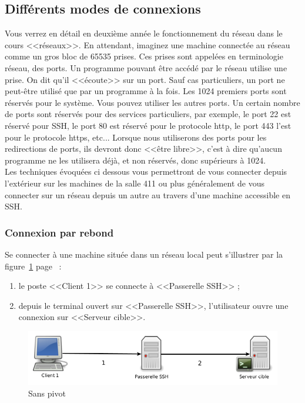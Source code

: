 \documentclass[11pt]{article}
\begin{document}
\subsection{Différents modes de connexions}

Vous verrez en détail en deuxième année le fonctionnement du réseau dans le cours <<réseaux>>.
En attendant, imaginez une machine connectée au réseau comme un gros bloc de 65535 prises. 
Ces prises sont appelées en terminologie réseau, des ports. 
Un programme pouvant être accédé par le réseau utilise une prise. 
On dit qu'il <<écoute>> sur un port. 
Sauf cas particuliers, un port ne peut-être utilisé que par un programme à la fois. 
Les 1024 premiers ports sont réservés pour le système.
Vous pouvez utiliser les autres ports.
Un certain nombre de ports sont réservés pour des services particuliers, par exemple, le port 22 est réservé pour SSH, le port 80 est réservé pour le protocole http, le port 443 l'est pour le protocole https, etc... 
Lorsque nous utiliserons des ports pour les redirections de ports, ils devront donc <<être libre>>, c'est à dire qu'aucun programme ne les utilisera déjà, et non réservés, donc supérieurs à 1024.\\

Les techniques évoquées ci dessous vous permettront de vous connecter depuis l'extérieur sur les machines de la salle 411 ou plus généralement de vous connecter sur un réseau depuis un autre au travers d'une machine accessible en SSH.

\subsubsection{Connexion par rebond}

Se connecter à une machine située dans un réseau local peut s'illustrer par la figure~\ref{pivot_simple} page~\pageref{pivot_simple} :
\begin{enumerate}
 \item le poste <<Client 1>> se connecte à <<Passerelle SSH>> ;
 \item depuis le terminal ouvert sur <<Passerelle SSH>>, l'utilisateur ouvre une connexion sur <<Serveur cible>>.
\end{enumerate}

\begin{figure}[h]
 \centering
 \includegraphics[width=15cm]{pivotA}
 \caption{\label{pivot_simple}Sans pivot}
\end{figure}
\end{document}
